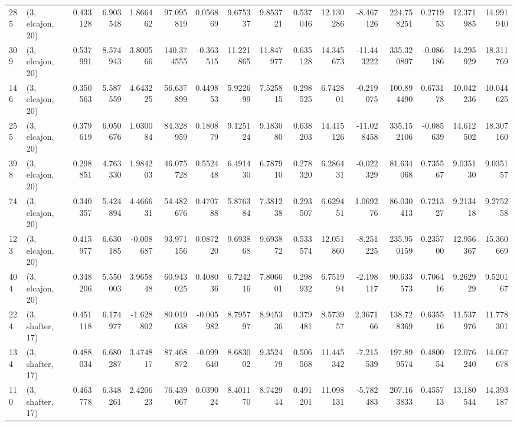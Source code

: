 \begin{tabular}{llrrrrrrrrrrrrrr}
285 &  (3, elcajon, 20) &   0.433128 &   6.903548 &   1.866462 &    97.095819 &   0.056869 &   9.675337 &   9.853721 &  0.537046 &  12.130286 &  -8.467126 &   224.758251 &  0.271953 &  12.371985 &  14.991940 \\
309 &  (3, elcajon, 20) &   0.537991 &   8.574943 &   3.800566 &   140.374555 &  -0.363515 &  11.221865 &  11.847977 &  0.635128 &  14.345673 & -11.443222 &   335.320897 & -0.086186 &  14.295929 &  18.311769 \\
146 &  (3, elcajon, 20) &   0.350563 &   5.587559 &   4.643225 &    56.637899 &   0.449853 &   5.922699 &   7.525815 &  0.298525 &   6.742801 &  -0.219075 &   100.894490 &  0.673178 &  10.042236 &  10.044625 \\
255 &  (3, elcajon, 20) &   0.379619 &   6.050676 &   1.030084 &    84.328959 &   0.180879 &   9.125124 &   9.183080 &  0.638203 &  14.415126 & -11.028458 &   335.152106 & -0.085639 &  14.612502 &  18.307160 \\
398 &  (3, elcajon, 20) &   0.298851 &   4.763330 &   1.984203 &    46.075728 &   0.552448 &   6.491430 &   6.787910 &  0.278320 &   6.286431 &  -0.022329 &    81.634068 &  0.735567 &   9.035130 &   9.035157 \\
74  &  (3, elcajon, 20) &   0.340357 &   5.424894 &   4.466631 &    54.482676 &   0.470788 &   5.876384 &   7.381238 &  0.293507 &   6.629451 &   1.069276 &    86.030413 &  0.721327 &   9.213418 &   9.275258 \\
123 &  (3, elcajon, 20) &   0.415977 &   6.630185 &  -0.008687 &    93.971156 &   0.087220 &   9.693868 &   9.693872 &  0.533574 &  12.051860 &  -8.251225 &   235.950159 &  0.235700 &  12.956367 &  15.360669 \\
404 &  (3, elcajon, 20) &   0.348206 &   5.550003 &   3.965848 &    60.943025 &   0.408036 &   6.724216 &   7.806601 &  0.298932 &   6.751994 &  -2.198117 &    90.633573 &  0.706416 &   9.262929 &   9.520167 \\
224 &  (3, shafter, 17) &   0.451118 &   6.174977 &  -1.628802 &    80.019038 &  -0.005982 &   8.795797 &   8.945336 &  0.379481 &   8.573957 &   2.367166 &   138.728369 &  0.635516 &  11.537976 &  11.778301 \\
134 &  (3, shafter, 17) &   0.488034 &   6.680287 &   3.474817 &    87.468872 &  -0.099640 &   8.683002 &   9.352479 &  0.506568 &  11.445342 &  -7.215539 &   197.899574 &  0.480054 &  12.076240 &  14.067678 \\
110 &  (3, shafter, 17) &   0.463778 &   6.348261 &   2.420623 &    76.439067 &   0.039024 &   8.401170 &   8.742944 &  0.491201 &  11.098131 &  -5.782483 &   207.163833 &  0.455713 &  13.180544 &  14.393187 \\

\end{tabular}
